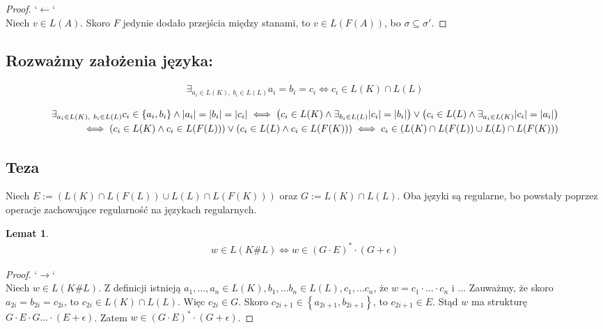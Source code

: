 \documentclass{article}
\newtheorem{lemma}[theorem]{Lemat}
\theoremstyle{definition}
\theoremstyle{remark}
\begin{document}
\begin{proof}
`\(\leftarrow\)` \\
Niech \(v \in L(A)\). Skoro \(F\) jedynie dodało przejścia między stanami, to \(v \in L(F(A))\),
bo \(\sigma \subseteq \sigma'\).
\end{proof}

\subsection{Rozważmy założenia języka:}

\begin{align*}
    \exists_{ a_i \in L(K), \ b_i \in L(L)} { a_i = b_i = c_i }\iff c_i \in L(K) \cap L(L)
\end{align*}

\begin{align*}
\exists_{ a_i \in L(K), \ b_i \in L(L)} { c_i \in \left\{ a_i, b_i \right\} \land \abs{a_i}=\abs{b_i}=\abs{c_i} }
\iff
\left( c_i \in L(K) \land \exists_{ b_i \in L(L) }{ \abs{c_i} = \abs{b_i} } \right) \lor \left( c_i \in L(L) \land \exists_{ a_i \in L(K) }{ \abs{c_i} = \abs{a_i} } \right)
\\ \iff
\left( c_i \in L(K) \land c_i \in L(F(L)) \right) \lor \left( c_i \in L(L) \land c_i \in L(F(K)) \right)
\iff
c_i \in \left( L(K) \cap L(F(L)) \cup L(L) \cap L(F(K)) \right)
\end{align*}

\subsection{Teza}

Niech \( E := \left( L(K) \cap L(F(L)) \cup L(L) \cap L(F(K)) \right) \) oraz \( G := L(K) \cap L(L) \).
Oba języki są regularne, bo powstały poprzez operacje zachowujące regularność na językach regularnych.

\begin{lemma}
    \begin{align*}
        w \in L(K \# L) \iff w \in \left( G \cdot E \right)^* \cdot \left( G + \epsilon \right)
    \end{align*}
\end{lemma}

\begin{proof}
`\(\rightarrow\)` \\
Niech \(w \in L(K \# L)\). Z definicji istnieją \(a_1, \ldots , a_n \in L(K), b_1, \ldots b_n \in L(L), c_1, \ldots c_n\), że \(w = c_1 \cdot \ldots \cdot c_n\) i \(\ldots\)
Zauważmy, że skoro \(a_{2i}=b_{2i}=c_{2i}\), to \(c_{2i} \in L(K) \cap L(L)\). 
Więc \(c_{2i} \in G\).
Skoro \(c_{2i+1} \in \left\{ a_{2i+1}, b_{2i+1} \right\}\), to \(c_{2i+1} \in E\).
Stąd \(w\) ma strukturę \(G \cdot E \cdot G \ldots \cdot \left( E + \epsilon \right)\).
Zatem \(w \in \left( G \cdot E \right)^* \cdot \left( G + \epsilon \right)\).
\end{proof}
\end{document}
